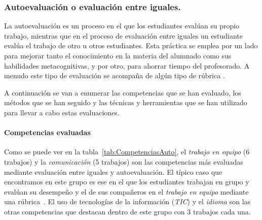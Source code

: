 \subsubsection{Autoevaluación o evaluación entre iguales.}

La autoevaluación es un proceso en el que los estudiantes evalúan su propio trabajo, mientras que  en el proceso de evaluación entre iguales un estudiante evalúa el trabajo de otro u otros estudiantes. Esta práctica se emplea por un lado para mejorar tanto el conocimiento en la materia del alumnado como sus habilidades metacognitivas, y por otro, para ahorrar tiempo del profesorado. A menudo este tipo de evaluación se acompaña de algún tipo de rúbrica \cite{malehorn1994ten}.

A continuación se van a enumerar las competencias que se han evaluado, los métodos que se han seguido y las técnicas y herramientas que se han utilizado para llevar a cabo estas evaluaciones.

\paragraph*{Competencias evaluadas}
Como se puede ver en la tabla~\ref{tab:CompetenciasAuto}, el \emph{trabajo en equipo} (6 trabajos) y la \emph{comunicación} (5 trabajos) son las competencias más evaluadas mediante evaluación entre iguales y autoevaluación. El típico caso que encontramos en este grupo es ese en el que los estudiantes trabajan en grupo y evalúan su desempeño y el de sus compañeros en el \emph{trabajo en equipo} mediante una rúbrica~\cite{ficapal2015learning}.
El uso de tecnologías de la información (\emph{TIC}) y el \emph{idioma} son las otras competencias que destacan dentro de este grupo con 3 trabajos cada una. 

